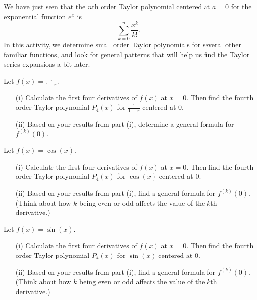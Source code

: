 \begin{activity} \label{8.5.Act2} We have just seen that the $n$th order Taylor polynomial centered at $a = 0$ for the exponential function $e^x$ is
\[\sum_{k=0}^{n} \frac{x^k}{k!}.\]
In this activity, we determine small order Taylor polynomials for several other familiar functions, and look for general patterns that will help us find the Taylor series expansions a bit later.
\ba
\item Let $f(x) = \frac{1}{1-x}$.
    \begin{itemize}
    \item[(i)] Calculate the first four derivatives of $f(x)$ at $x=0$. Then find the fourth order Taylor polynomial $P_4(x)$ for $\frac{1}{1-x}$ centered at 0.
 
    \item[(ii)]  Based on your results from part (i), determine a general formula for $f^{(k)}(0)$.
 
    \end{itemize}
 
 
\item Let $f(x) = \cos(x)$.
    \begin{itemize}
    \item[(i)] Calculate the first four derivatives of $f(x)$ at $x=0$. Then find the fourth order Taylor polynomial $P_4(x)$ for $\cos(x)$ centered at 0.
 
    \item[(ii)] Based on your results from part (i), find a general formula for $f^{(k)}(0)$.  (Think about how $k$ being even or odd affects the value of the $k$th derivative.)
 
    \end{itemize}
 
\item Let $f(x) = \sin(x)$.
    \begin{itemize}
    \item[(i)] Calculate the first four derivatives of $f(x)$ at $x=0$. Then find the fourth order Taylor polynomial $P_4(x)$ for $\sin(x)$ centered at 0.
 
    \item[(ii)] Based on your results from part (i), find a general formula for $f^{(k)}(0)$.  (Think about how $k$ being even or odd affects the value of the $k$th derivative.)
 
    \end{itemize}
 
\ea
 
\end{activity}

